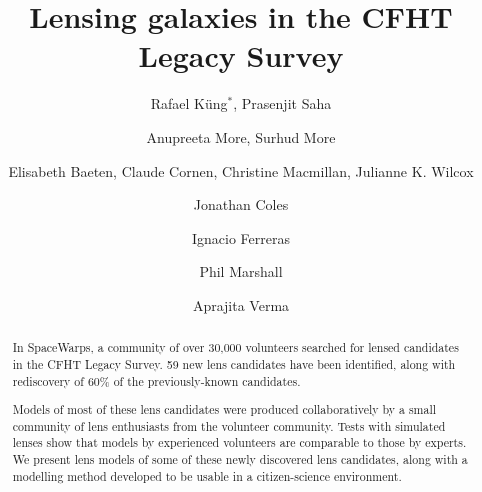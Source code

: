 \documentclass{ws-procs975x65}
\begin{document}
\title{Lensing galaxies in the CFHT Legacy Survey}

\author{
  Rafael K\"ung$^*$, Prasenjit Saha
}
\address{
Physik-Institut, University of Zurich,\\
Winterthurerstrasse 190, 8057 Zurich, Switzerland\\
$^*$E-mail: rafael\_kueng@uzh.ch
}
\author{
  Anupreeta More, Surhud More
}
\address{
  Kavli Institute for the Physics and Mathematics of the Universe, University of Tokyo\\ 5-1-5 Kashiwanoha, Kashiwa-shi 277-8583, Japan
}

\author{
  Elisabeth Baeten, Claude Cornen, Christine Macmillan, Julianne K. Wilcox
}
\address{
  Zooniverse, c/o Astrophysics Department, University of Oxford\\
  Oxford OX1 3RH, UK
}

\author{
  Jonathan Coles
}
\address{
  Exascale Research Computing Lab, Campus Teratec,\\
  2 Rue de la Piquetterie, 91680 Bruyeres-le-Chatel, France
}

\author{Ignacio Ferreras}
\address{Mullard Space Science Laboratory, University College London, Holmbury St Mary, Dorking, Surrey RH5 6NT, UK}

\author{
  Phil Marshall
}
\address{
  Kavli Institute for Particle Astrophysics and Cosmology, Stanford University\\
  452 Lomita Mall, Stanford, CA 94035, USA
}

\author{
  Aprajita Verma
}
\address{
  Sub-department of Astrophysics, University of Oxford, Denys Wilkinson Building\\
  Keble Road, Oxford, OX1 3RH, UK
}






\begin{abstract}
In SpaceWarps, a community of over 30,000 volunteers searched for lensed candidates in the CFHT Legacy Survey.
59 new lens candidates have been identified, along with rediscovery of 60\% of the previously-known candidates.

Models of most of these lens candidates were produced collaboratively by a small community of lens enthusiasts from the volunteer community.
Tests with simulated lenses show that models by experienced volunteers are comparable to those by experts.
We present lens models of some of these newly discovered lens candidates, along with a modelling method developed to be usable in a citizen-science environment.
\end{abstract}
\end{document}
